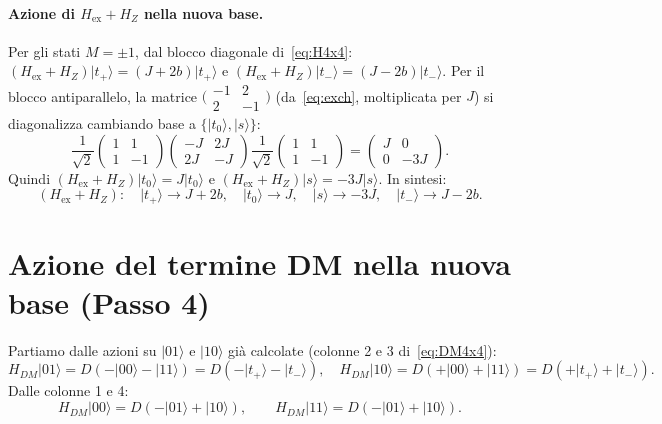 \documentclass[11pt,a4paper]{article}
\newcommand{\ket}[1]{\lvert #1 \rangle}
\theoremstyle{definition}
\begin{document}
\paragraph{Azione di $H_{\mathrm{ex}}+H_Z$ nella nuova base.}
Per gli stati $M=\pm1$, dal blocco diagonale di~\eqref{eq:H4x4}:
$(H_{\mathrm{ex}}+H_Z)\ket{t_+}=(J+2b)\ket{t_+}$ e $(H_{\mathrm{ex}}+H_Z)\ket{t_-}=(J-2b)\ket{t_-}$.
Per il blocco antiparallelo, la matrice $\bigl(\begin{smallmatrix}-1&2\\2&-1\end{smallmatrix}\bigr)$
(da~\eqref{eq:exch}, moltiplicata per $J$) si diagonalizza cambiando base a
$\{\ket{t_0},\ket{s}\}$:
\[
\frac{1}{\sqrt2}\begin{pmatrix}1&1\\1&-1\end{pmatrix}
\begin{pmatrix}-J&2J\\2J&-J\end{pmatrix}
\frac{1}{\sqrt2}\begin{pmatrix}1&1\\1&-1\end{pmatrix}
=\begin{pmatrix}J&0\\0&-3J\end{pmatrix}.
\]
Quindi $(H_{\mathrm{ex}}+H_Z)\ket{t_0}=J\ket{t_0}$ e $(H_{\mathrm{ex}}+H_Z)\ket{s}=-3J\ket{s}$.
In sintesi:
\begin{equation}
(H_{\mathrm{ex}}+H_Z):\quad
\ket{t_+}\to J+2b,\quad \ket{t_0}\to J,\quad \ket{s}\to -3J,\quad \ket{t_-}\to J-2b.
\label{eq:HexZ}
\end{equation}

\FloatBarrier
\section{Azione del termine DM nella nuova base (Passo 4)}

Partiamo dalle azioni su $\ket{01}$ e $\ket{10}$ già calcolate (colonne 2 e 3 di~\eqref{eq:DM4x4}):
\begin{equation}
H_{DM}\ket{01}=D(-\ket{00}-\ket{11})=D(-\ket{t_+}-\ket{t_-}),\quad
H_{DM}\ket{10}=D(+\ket{00}+\ket{11})=D(+\ket{t_+}+\ket{t_-}).
\label{eq:DM01}
\end{equation}
Dalle colonne 1 e 4:
\begin{equation}
H_{DM}\ket{00}=D(-\ket{01}+\ket{10}),\qquad
H_{DM}\ket{11}=D(-\ket{01}+\ket{10}).
\label{eq:DM00}
\end{equation}
\end{document}
